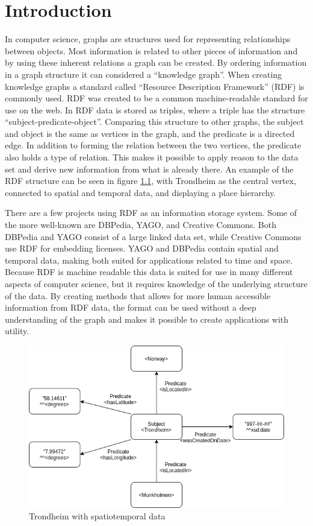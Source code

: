 \chapter{Introduction}
\label{cha:Introduction}
In computer science, graphs are structures used for representing relationships between objects. Most information is related to other pieces of information and by using these inherent relations a graph can be created. By ordering information in a graph structure it can considered a ``knowledge graph''. When creating knowledge graphs a standard called ``Resource Description Framework'' (RDF) is commonly used. RDF was created to be a common machine-readable standard for use on the web. In RDF data is stored as triples, where a triple has the structure ``subject-predicate-object''. Comparing this structure to other graphs, the subject and object is the same as vertices in the graph, and the predicate is a directed edge. In addition to forming the relation between the two vertices, the predicate also holds a type of relation. This makes it possible to apply reason to the data set and derive new information from what is already there. An example of the RDF structure can be seen in figure \ref{fig:spatiotemporalTrondheim}, with Trondheim as the central vertex, connected to spatial and temporal data, and displaying a place hierarchy.

There are a few projects using RDF as an information storage system. Some of the more well-known are DBPedia\cite{dbpedia}, YAGO\cite{yago}, and Creative Commons. Both DBPedia and YAGO consist of a large linked data set, while Creative Commons use RDF for embedding licenses. YAGO and DBPedia contain spatial and temporal data, making both suited for applications related to time and space. Because RDF is machine readable this data is suited for use in many different aspects of computer science, but it requires knowledge of the underlying structure of the data. By creating methods that allows for more human accessible information from RDF data, the format can be used without a deep understanding of the graph and makes it possible to create applications with utility.

\begin{figure}[t]
  \centering
  \includegraphics[scale=0.5]{figs/rdfSPO.png}
 \caption{Trondheim with spatiotemporal data}
 \label{fig:spatiotemporalTrondheim}
\end{figure}

